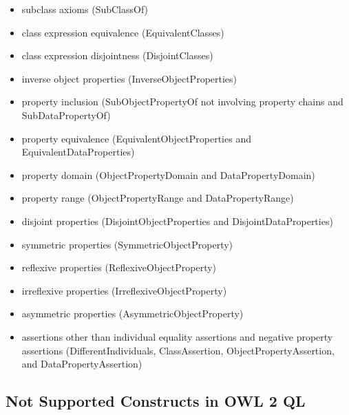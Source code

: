 \documentclass{llncs}
\begin{document}
\begin{itemize}
	\item subclass axioms (SubClassOf)
  \item class expression equivalence (EquivalentClasses)
  \item class expression disjointness (DisjointClasses)
  \item inverse object properties (InverseObjectProperties)
  \item property inclusion (SubObjectPropertyOf not involving property chains and SubDataPropertyOf)
  \item property equivalence (EquivalentObjectProperties and EquivalentDataProperties)
  \item property domain (ObjectPropertyDomain and DataPropertyDomain)
  \item property range (ObjectPropertyRange and DataPropertyRange)
  \item disjoint properties (DisjointObjectProperties and DisjointDataProperties)
  \item symmetric properties (SymmetricObjectProperty)
  \item reflexive properties (ReflexiveObjectProperty)
  \item irreflexive properties (IrreflexiveObjectProperty)
  \item asymmetric properties (AsymmetricObjectProperty)
  \item assertions other than individual equality assertions and negative property assertions (DifferentIndividuals, ClassAssertion, ObjectPropertyAssertion, and DataPropertyAssertion) 
\end{itemize}

\subsection{Not Supported Constructs in OWL 2 QL}
\end{document}
